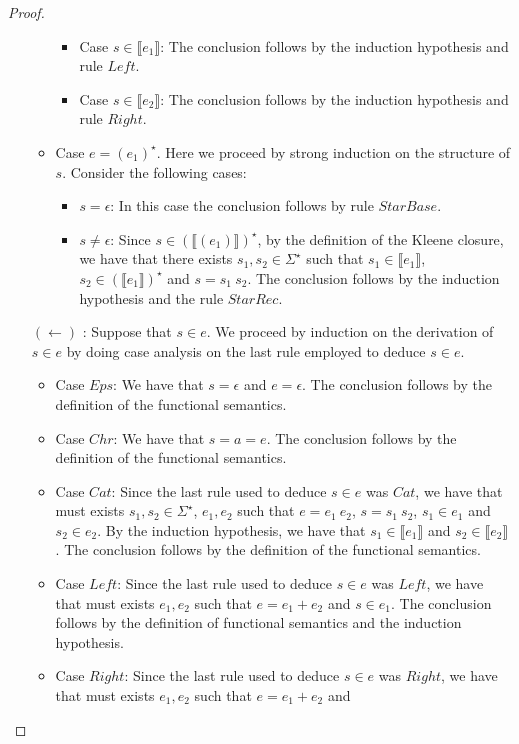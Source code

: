 \documentclass[oneside,12pt]{scrbook}
\theoremstyle{definition}
\newcommand{\sembrackets}[1]{\ensuremath{\llbracket #1 \rrbracket}}
\theoremstyle{plain}
\theoremstyle{definition}
\begin{document}
\begin{proof}
\begin{itemize}
\begin{itemize}
\begin{itemize}
				\item Case $s \in\sembrackets{e_1}$: The conclusion follows by the induction hypothesis and rule $Left$.
				\item Case $s \in\sembrackets{e_2}$: The conclusion follows by the induction hypothesis and rule $Right$.
			\end{itemize}
			\item Case $e = (e_1)^\star$. Here we proceed by strong induction on the structure of $s$. Consider the following cases:
			\begin{itemize}
				\item $s = \epsilon$: In this case the conclusion follows by rule $StarBase$.
				\item $s \neq \epsilon$: Since $s \in(\sembrackets{(e_1)})^\star$, by the definition of
				the Kleene closure, we have that there exists $s_1, s_2 \in \Sigma^\star$ such that $s_1 \in\sembrackets{e_1}$,
				$s_2 \in(\sembrackets{e_1})^\star$ and $s = s_1\:s_2$. The conclusion follows by the induction hypothesis and the rule $StarRec$.
			\end{itemize}
		\end{itemize}
		\item[$(\leftarrow)$]: Suppose that $s \in e$. We proceed by induction on the derivation of $s \in e$ by doing case analysis on the last
		rule employed to deduce $s \in e$.
		\begin{itemize}
			\item Case $Eps$: We have that $s = \epsilon$ and $e = \epsilon$. The conclusion follows by the definition of the functional semantics.
			\item Case $Chr$: We have that $s = a = e$. The conclusion follows by the definition of the functional semantics.
			\item Case $Cat$: Since the last rule used to deduce $s \in e$ was $Cat$, we have that must exists $s_1, s_2\in\Sigma^\star$, $e_1, e_2$ such that
			$e = e_1\:e_2$, $s = s_1\:s_2$, $s_1 \in e_1$ and $s_2 \in e_2$. By the induction hypothesis, we have that $s_1 \in\sembrackets{e_1}$ and
			$s_2 \in \sembrackets{e_2}$. The conclusion follows by the definition of the functional semantics.
			\item Case $Left$: Since the last rule used to deduce $s \in e$ was $Left$, we have that must exists $e_1, e_2$ such that $e = e_1 + e_2$ and
			$s \in e_1$. The conclusion follows by the definition of functional semantics and the induction hypothesis.
			\item Case $Right$: Since the last rule used to deduce $s \in e$ was $Right$, we have that must exists $e_1, e_2$ such that $e = e_1 + e_2$ and

\end{itemize}
\end{itemize}
\end{proof}
\end{document}
